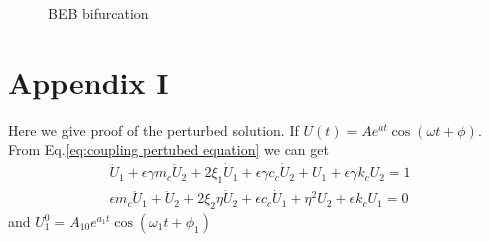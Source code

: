 \documentclass{article}
\begin{document}
\begin{figure}[htbp]
    \centering
    \label{fig:3DOF airfoil diagram}
    \caption{ BEB bifurcation}
\end{figure}
%

\appendix
\renewcommand{\theequation}{\Alph{section}.\arabic{equation}}
\renewcommand{\thesubsection}{\Alph{section}.\arabic{subsection}}
\renewcommand{\thesubsubsection}{\Alph{section}.\arabic{subsection}.\arabic{subsubsection}}
\renewcommand{\thefigure}{\Alph{section}.\arabic{figure}}
\renewcommand{\thetable}{\Alph{section}.\arabic{table}}
\clearpage

\section{Appendix I} 
\setcounter{table}{0}
\setcounter{equation}{0}
\label{Appendix I}
Here we give proof of the perturbed solution.
If $U(t)=Ae^{a t}\cos(\omega t+\phi)$. From Eq.\ref{eq:coupling pertubed equation} we can get
\begin{align}
    \ddot{U}_1+\epsilon  \gamma m_c \ddot{U}_2 +2 \xi_1 \dot{U}_1+\epsilon \gamma c_c \dot{U}_2+U_1+\epsilon \gamma k_c U_2=1\\
    \epsilon m_c \ddot{U}_1 + \ddot{U}_2 + 2 \xi_2 \eta \dot{U}_2+\epsilon c_c \dot{U}_1+\eta^2 U_2+\epsilon k_c U_1=0
\end{align}
and $U_1^0=A_{10} e^{a_1 t}\cos(\omega_1 t+ \phi_1)$
\end{document}
